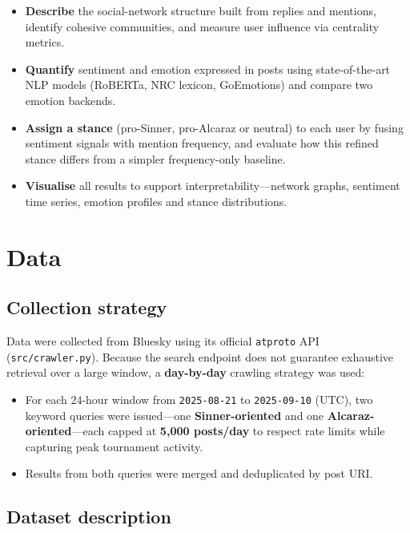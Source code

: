 \documentclass[12pt,a4paper]{article}
\begin{document}
\begin{itemize}
    \item \textbf{Describe} the social-network structure built from replies and mentions,
    identify cohesive communities, and measure user influence via centrality metrics.
    \item \textbf{Quantify} sentiment and emotion expressed in posts using state-of-the-art
    NLP models (RoBERTa, NRC lexicon, GoEmotions) and compare two emotion backends.
    \item \textbf{Assign a stance} (pro-Sinner, pro-Alcaraz or neutral) to each user by fusing
    sentiment signals with mention frequency, and evaluate how this refined stance differs from a
    simpler frequency-only baseline.
    \item \textbf{Visualise} all results to support interpretability---network graphs, sentiment
    time series, emotion profiles and stance distributions.
\end{itemize}

\bigskip

\section{Data}

\subsection{Collection strategy}

Data were collected from Bluesky using its official \texttt{atproto} API
(\texttt{src/crawler.py}). Because the search endpoint does not guarantee exhaustive retrieval
over a large window, a \textbf{day-by-day} crawling strategy was used:

\begin{itemize}
    \item For each 24-hour window from \texttt{2025-08-21} to \texttt{2025-09-10} (UTC), two
    keyword queries were issued---one \textbf{Sinner-oriented} and one
    \textbf{Alcaraz-oriented}---each capped at \textbf{5{,}000 posts/day} to respect rate limits
    while capturing peak tournament activity.
    \item Results from both queries were merged and deduplicated by post URI.
\end{itemize}

\subsection{Dataset description}
\end{document}
